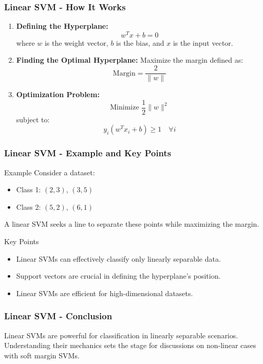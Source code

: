\documentclass{beamer}
\begin{document}
\begin{frame}[fragile]
    \frametitle{Linear SVM - How It Works}
    \begin{enumerate}
        \item \textbf{Defining the Hyperplane:} 
        \[
        w^T x + b = 0
        \]
        where \( w \) is the weight vector, \( b \) is the bias, and \( x \) is the input vector.
        
        \item \textbf{Finding the Optimal Hyperplane:} Maximize the margin defined as:
        \[
        \text{Margin} = \frac{2}{\|w\|}
        \]
        
        \item \textbf{Optimization Problem:} 
        \[
        \text{Minimize } \frac{1}{2} \|w\|^2 
        \]
        subject to:
        \[
        y_i (w^T x_i + b) \geq 1 \quad \forall i
        \]
    \end{enumerate}
\end{frame}

\begin{frame}[fragile]
    \frametitle{Linear SVM - Example and Key Points}
    \begin{block}{Example}
        Consider a dataset:
        \begin{itemize}
            \item Class 1: \((2, 3)\), \((3, 5)\)
            \item Class 2: \((5, 2)\), \((6, 1)\)
        \end{itemize}
        A linear SVM seeks a line to separate these points while maximizing the margin.
    \end{block}

    \begin{block}{Key Points}
        \begin{itemize}
            \item Linear SVMs can effectively classify only linearly separable data.
            \item Support vectors are crucial in defining the hyperplane's position.
            \item Linear SVMs are efficient for high-dimensional datasets.
        \end{itemize}
    \end{block}
\end{frame}

\begin{frame}[fragile]
    \frametitle{Linear SVM - Conclusion}
    Linear SVMs are powerful for classification in linearly separable scenarios. Understanding their mechanics sets the stage for discussions on non-linear cases with soft margin SVMs.
\end{frame}
\end{document}
